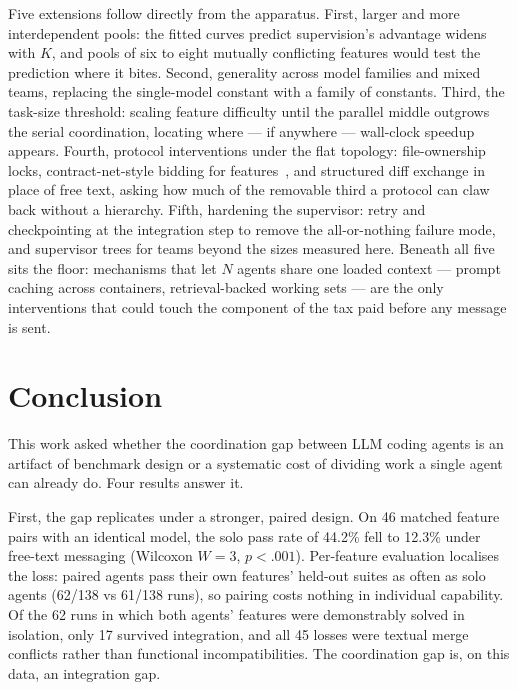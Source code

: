\documentclass[11pt,a4paper]{article}
\begin{document}
Five extensions follow directly from the apparatus. First, larger and more interdependent pools: the fitted curves predict supervision's advantage widens with $K$, and pools of six to eight mutually conflicting features would test the prediction where it bites. Second, generality across model families and mixed teams, replacing the single-model constant with a family of constants. Third, the task-size threshold: scaling feature difficulty until the parallel middle outgrows the serial coordination, locating where --- if anywhere --- wall-clock speedup appears. Fourth, protocol interventions under the flat topology: file-ownership locks, contract-net-style bidding for features~\cite{smith1980contractnet}, and structured diff exchange in place of free text, asking how much of the removable third a protocol can claw back without a hierarchy. Fifth, hardening the supervisor: retry and checkpointing at the integration step to remove the all-or-nothing failure mode, and supervisor trees for teams beyond the sizes measured here. Beneath all five sits the floor: mechanisms that let $N$ agents share one loaded context --- prompt caching across containers, retrieval-backed working sets --- are the only interventions that could touch the component of the tax paid before any message is sent.

%
%
\FloatBarrier
\section{Conclusion}\label{sec:conclusion}

This work asked whether the coordination gap between LLM coding agents is an artifact of benchmark design or a systematic cost of dividing work a single agent can already do. Four results answer it.

First, the gap replicates under a stronger, paired design. On 46 matched feature pairs with an identical model, the solo pass rate of 44.2\% fell to 12.3\% under free-text messaging (Wilcoxon $W = 3$, $p < .001$). Per-feature evaluation localises the loss: paired agents pass their own features' held-out suites as often as solo agents (62/138 vs 61/138 runs), so pairing costs nothing in individual capability. Of the 62 runs in which both agents' features were demonstrably solved in isolation, only 17 survived integration, and all 45 losses were textual merge conflicts rather than functional incompatibilities. The coordination gap is, on this data, an integration gap.
\end{document}

